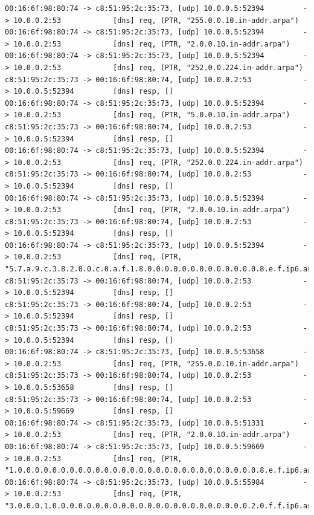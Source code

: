 \documentclass[11pt]{diazessay} %
\begin{document}
\begin{lstlisting}
00:16:6f:98:80:74 -> c8:51:95:2c:35:73, [udp] 10.0.0.5:52394         -> 10.0.0.2:53            [dns] req, (PTR, "255.0.0.10.in-addr.arpa")
00:16:6f:98:80:74 -> c8:51:95:2c:35:73, [udp] 10.0.0.5:52394         -> 10.0.0.2:53            [dns] req, (PTR, "2.0.0.10.in-addr.arpa")
00:16:6f:98:80:74 -> c8:51:95:2c:35:73, [udp] 10.0.0.5:52394         -> 10.0.0.2:53            [dns] req, (PTR, "252.0.0.224.in-addr.arpa")
c8:51:95:2c:35:73 -> 00:16:6f:98:80:74, [udp] 10.0.0.2:53            -> 10.0.0.5:52394         [dns] resp, []
00:16:6f:98:80:74 -> c8:51:95:2c:35:73, [udp] 10.0.0.5:52394         -> 10.0.0.2:53            [dns] req, (PTR, "5.0.0.10.in-addr.arpa")
c8:51:95:2c:35:73 -> 00:16:6f:98:80:74, [udp] 10.0.0.2:53            -> 10.0.0.5:52394         [dns] resp, []
00:16:6f:98:80:74 -> c8:51:95:2c:35:73, [udp] 10.0.0.5:52394         -> 10.0.0.2:53            [dns] req, (PTR, "252.0.0.224.in-addr.arpa")
c8:51:95:2c:35:73 -> 00:16:6f:98:80:74, [udp] 10.0.0.2:53            -> 10.0.0.5:52394         [dns] resp, []
00:16:6f:98:80:74 -> c8:51:95:2c:35:73, [udp] 10.0.0.5:52394         -> 10.0.0.2:53            [dns] req, (PTR, "2.0.0.10.in-addr.arpa")
c8:51:95:2c:35:73 -> 00:16:6f:98:80:74, [udp] 10.0.0.2:53            -> 10.0.0.5:52394         [dns] resp, []
00:16:6f:98:80:74 -> c8:51:95:2c:35:73, [udp] 10.0.0.5:52394         -> 10.0.0.2:53            [dns] req, (PTR, "5.7.a.9.c.3.8.2.0.0.c.0.a.f.1.8.0.0.0.0.0.0.0.0.0.0.0.0.0.8.e.f.ip6.arpa")
c8:51:95:2c:35:73 -> 00:16:6f:98:80:74, [udp] 10.0.0.2:53            -> 10.0.0.5:52394         [dns] resp, []
c8:51:95:2c:35:73 -> 00:16:6f:98:80:74, [udp] 10.0.0.2:53            -> 10.0.0.5:52394         [dns] resp, []
c8:51:95:2c:35:73 -> 00:16:6f:98:80:74, [udp] 10.0.0.2:53            -> 10.0.0.5:52394         [dns] resp, []
00:16:6f:98:80:74 -> c8:51:95:2c:35:73, [udp] 10.0.0.5:53658         -> 10.0.0.2:53            [dns] req, (PTR, "255.0.0.10.in-addr.arpa")
c8:51:95:2c:35:73 -> 00:16:6f:98:80:74, [udp] 10.0.0.2:53            -> 10.0.0.5:53658         [dns] resp, []
c8:51:95:2c:35:73 -> 00:16:6f:98:80:74, [udp] 10.0.0.2:53            -> 10.0.0.5:59669         [dns] resp, []
00:16:6f:98:80:74 -> c8:51:95:2c:35:73, [udp] 10.0.0.5:51331         -> 10.0.0.2:53            [dns] req, (PTR, "2.0.0.10.in-addr.arpa")
00:16:6f:98:80:74 -> c8:51:95:2c:35:73, [udp] 10.0.0.5:59669         -> 10.0.0.2:53            [dns] req, (PTR, "1.0.0.0.0.0.0.0.0.0.0.0.0.0.0.0.0.0.0.0.0.0.0.0.0.0.0.0.0.8.e.f.ip6.arpa")
00:16:6f:98:80:74 -> c8:51:95:2c:35:73, [udp] 10.0.0.5:55984         -> 10.0.0.2:53            [dns] req, (PTR, "3.0.0.0.1.0.0.0.0.0.0.0.0.0.0.0.0.0.0.0.0.0.0.0.0.0.0.0.2.0.f.f.ip6.arpa")

\end{lstlisting}
\end{document}

